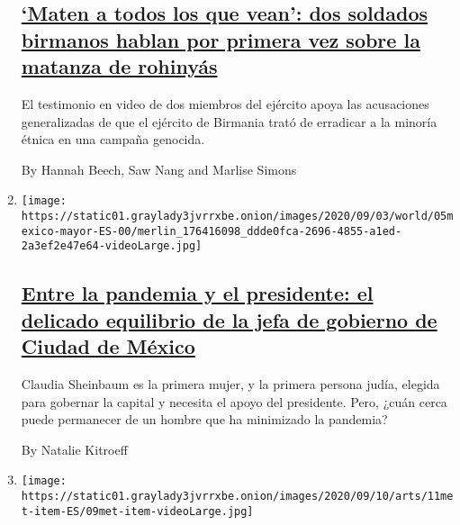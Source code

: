 \begin{enumerate}
  \hypertarget{maten-a-todos-los-que-vean-dos-soldados-birmanos-hablan-por-primera-vez-sobre-la-matanza-de-rohinyuxe1s}{%
  \subsection{\texorpdfstring{\href{/es/2020/09/08/espanol/mundo/rohinya-genocidio-birmania.html}{`Maten
  a todos los que vean': dos soldados birmanos hablan por primera vez
  sobre la matanza de
  rohinyás}}{`Maten a todos los que vean': dos soldados birmanos hablan por primera vez sobre la matanza de rohinyás}}\label{maten-a-todos-los-que-vean-dos-soldados-birmanos-hablan-por-primera-vez-sobre-la-matanza-de-rohinyuxe1s}}

  El testimonio en video de dos miembros del ejército apoya las
  acusaciones generalizadas de que el ejército de Birmania trató de
  erradicar a la minoría étnica en una campaña genocida.

  By Hannah Beech, Saw Nang and Marlise Simons
\item
  \texttt{[image: https://static01.graylady3jvrrxbe.onion/images/2020/09/03/world/05mexico-mayor-ES-00/merlin\_176416098\_ddde0fca-2696-4855-a1ed-2a3ef2e47e64-videoLarge.jpg]}

  \hypertarget{entre-la-pandemia-y-el-presidente-el-delicado-equilibrio-de-la-jefa-de-gobierno-de-ciudad-de-muxe9xico}{%
  \subsection{\texorpdfstring{\href{/es/2020/09/05/espanol/america-latina/coronavirus-amlo-sheinbaum.html}{Entre
  la pandemia y el presidente: el delicado equilibrio de la jefa de
  gobierno de Ciudad de
  México}}{Entre la pandemia y el presidente: el delicado equilibrio de la jefa de gobierno de Ciudad de México}}\label{entre-la-pandemia-y-el-presidente-el-delicado-equilibrio-de-la-jefa-de-gobierno-de-ciudad-de-muxe9xico}}

  Claudia Sheinbaum es la primera mujer, y la primera persona judía,
  elegida para gobernar la capital y necesita el apoyo del presidente.
  Pero, ¿cuán cerca puede permanecer de un hombre que ha minimizado la
  pandemia?

  By Natalie Kitroeff
\item
  \texttt{[image: https://static01.graylady3jvrrxbe.onion/images/2020/09/10/arts/11met-item-ES/09met-item-videoLarge.jpg]}

  \hypertarget{patricia-marroquin-norby-la-primera-curadora-nativa-estadounidense-del-met-a-tiempo-completo}{%
}
\end{enumerate}
